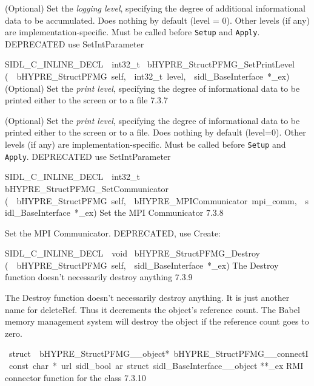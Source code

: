 \documentclass{article}
\begin{document}
\begin{cxxentry}
\begin{cxxentry}
\begin{cxxfunction}
\begin{cxxdoc}
(Optional) Set the {\it logging level}, specifying the degree
of additional informational data to be accumulated.  Does
nothing by default (level = 0).  Other levels (if any) are
implementation-specific.  Must be called before {\tt Setup}
and {\tt Apply}.
DEPRECATED   use SetIntParameter
\end{cxxdoc}
\end{cxxfunction}
\begin{cxxfunction}
{SIDL\_C\_INLINE\_DECL\ \ int32\_t\ }
        {bHYPRE\_StructPFMG\_SetPrintLevel}
        {(\ \ bHYPRE\_StructPFMG\ self,\ \ int32\_t\ level,\ \ sidl\_BaseInterface\ *\_ex)}
        {
(Optional) Set the {\it print level}, specifying the degree
of informational data to be printed either to the screen or
to a file}
        {7.3.7}
\begin{cxxdoc}

(Optional) Set the {\it print level}, specifying the degree
of informational data to be printed either to the screen or
to a file.  Does nothing by default (level=0).  Other levels
(if any) are implementation-specific.  Must be called before
{\tt Setup} and {\tt Apply}.
DEPRECATED   use SetIntParameter
\end{cxxdoc}
\end{cxxfunction}
\begin{cxxfunction}
{SIDL\_C\_INLINE\_DECL\ \ int32\_t\ }
        {bHYPRE\_StructPFMG\_SetCommunicator}
        {(\ \ bHYPRE\_StructPFMG\ self,\ \ bHYPRE\_MPICommunicator\ mpi\_comm,\ \ sidl\_BaseInterface\ *\_ex)}
        {
Set the MPI Communicator}
        {7.3.8}
\begin{cxxdoc}

Set the MPI Communicator.
DEPRECATED, use Create:
\end{cxxdoc}
\end{cxxfunction}
\begin{cxxfunction}
{SIDL\_C\_INLINE\_DECL\ \ void\ }
        {bHYPRE\_StructPFMG\_Destroy}
        {(\ \ bHYPRE\_StructPFMG\ self,\ \ sidl\_BaseInterface\ *\_ex)}
        {
The Destroy function doesn't necessarily destroy anything}
        {7.3.9}
\begin{cxxdoc}

The Destroy function doesn't necessarily destroy anything.
It is just another name for deleteRef.  Thus it decrements the
object's reference count.  The Babel memory management system will
destroy the object if the reference count goes to zero.
\end{cxxdoc}
\end{cxxfunction}
\begin{cxxvariable}
{\ struct\ \ bHYPRE\_StructPFMG\_\_object*\ bHYPRE\_StructPFMG\_\_connectI\ const\ char\ *\ url\ sidl\_bool\ ar\ struct\ sidl\_BaseInterface\_\_object}
        {**\_ex}
        {}
        {
RMI connector function for the class}
        {7.3.10}
\begin{cxxdoc}


\end{cxxdoc}
\end{cxxvariable}
\end{cxxentry}
\end{cxxentry}
\end{document}
